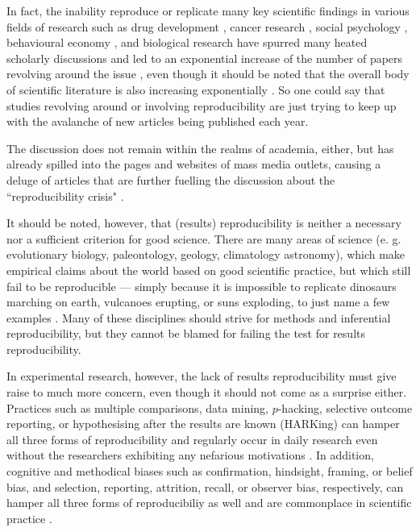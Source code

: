 \documentclass[11pt, a4paper,twoside]{report}\usepackage[]{graphicx}\usepackage[]{color}
\begin{document}
In fact, the inability reproduce or replicate many key scientific findings in various fields of research such as drug development \citep{prinz_believe_2011,begley2012drug}, cancer research \citep{nosek_reproducibility_2017}, social psychology \citep{aarts2015estimating}, behavioural economy \citep{camerer_evaluating_2016}, and biological research \citep{freedman_economics_2015,vogt_authorization_2016} have spurred many heated scholarly discussions and led to an exponential increase of the number of papers revolving around the issue \citep{goodman_what_2016}, even though it should be noted that the overall body of scientific literature is also increasing exponentially \citep{bornmann2015growth}. So one could say that studies revolving around or involving reproducibility are just trying to keep up with the avalanche of new articles being published each year.

The discussion does not remain within the realms of academia, either, but has already spilled into the pages and websites of mass media outlets, causing a deluge of articles that are further fuelling the discussion about the ``reproducibility crisis" \citep{lehrer_truth_2010,carey_psychology_2015,carey_scrutiny_2015,achenbach_many_2015,achenbach_reproducibility_2015,yong_psychology_2016,engber_broken_2016,baker_crisis_2016,econ_try_2016,feilden_most_2017,belluz_cancer_2017,meyer_fix_2017}.

It should be noted, however, that (results) reproducibility is neither a necessary nor a sufficient criterion for good science. There are many areas of science (e. g. evolutionary biology, paleontology, geology, climatology astronomy), which make empirical claims about the world based on good scientific practice, but which still fail to be reproducible --- simply because it is impossible to replicate dinosaurs marching on earth, vulcanoes erupting, or suns exploding, to just name a few examples \citep{dfg_reproduzierbarkeit_2017}. Many of these disciplines should strive for methods and inferential reproducibility, but they cannot be blamed for failing the test for results reproducibility. 

In experimental research, however, the lack of results reproducibility must give raise to much more concern, even though it should not come as a surprise either. Practices such as multiple comparisons, data mining, $p$-hacking, selective outcome reporting, or hypothesising after the results are known (HARKing) can hamper all three forms of reproducibility and regularly occur in daily research even without the researchers exhibiting any nefarious motivations \citep{goodman_what_2016}. In addition, cognitive and methodical biases such as confirmation, hindsight, framing, or belief bias, and selection, reporting, attrition, recall, or observer bias, respectively, can hamper all three forms of reproducibiliy as well and are commonplace in scientific practice \citep{munafo_manifesto_2017}.
\end{document}
